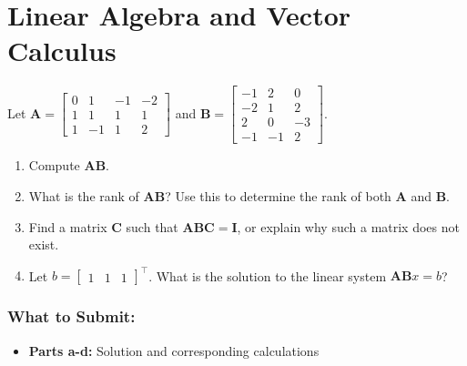 \documentclass{article}
\begin{document}
\section*{Linear Algebra and Vector Calculus}
\begin{aprob}
    Let $\mathbf{A} = \begin{bmatrix}
            0 & 1 & -1 & -2 \\
            1 & 1 & 1 & 1 \\
            1 & -1 & 1 & 2
        \end{bmatrix}$ and $\mathbf{B} = \begin{bmatrix}
            -1 & 2 & 0 \\
            -2 & 1 & 2 \\
            2 & 0 & -3 \\
            -1 & -1 & 2
        \end{bmatrix}$.
    \begin{enumerate} 
        \item{} Compute $\mathbf{AB}$.
        \item{} What is the rank of $\mathbf{AB}$? Use this to determine the rank of both $\mathbf{A}$ and $\mathbf{B}$.
        \item{} Find a matrix $\mathbf{C}$ such that $\mathbf{ABC} = \mathbf{I}$, or explain why such a matrix does not exist.
        \item{} Let $b = \begin{bmatrix}
            1 &
            1 &
            1
        \end{bmatrix}^\top$. What is the solution to the linear system $\mathbf{A} \mathbf{B} x = b$?
    \end{enumerate}
    
    \subsubsection*{What to Submit:}
    \begin{itemize}
        \item \textbf{Parts a-d:} Solution and corresponding calculations
    \end{itemize}
\end{aprob}
\end{document}
